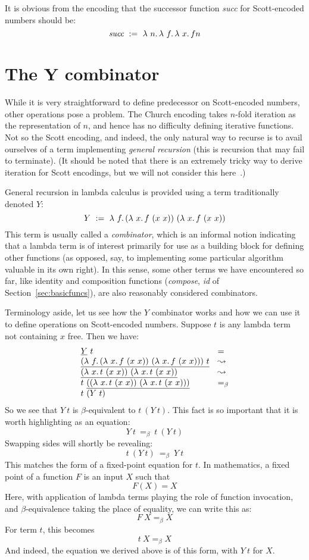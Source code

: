 It is obvious from the encoding that the successor function \textit{succ} for Scott-encoded numbers should be:
\[
\textit{succ}\ := \ \lambda\ n.\, \lambda\ f.\, \lambda\ x.\, f n
\]

\section{The Y combinator}
\label{sec:y}

While it is very straightforward to define predecessor on
Scott-encoded numbers, other operations pose a problem.  The Church
encoding takes $n$-fold iteration as the representation of $n$, and
hence has no difficulty defining iterative functions.  Not so the
Scott encoding, and indeed, the only natural way to recurse is to
avail ourselves of a term implementing \emph{general recursion} (this
is recursion that may fail to terminate).  (It should be noted that
there is an extremely tricky way to derive iteration for Scott encodings, but
we will not consider this here~\cite{lepigre+19}.)

General recursion in lambda calculus is provided using a term traditionally
denoted $Y$:
\[
Y \ :=\ \lam{f}{(\lam{x}{f\ (x\ x)})\ (\lam{x}{f\ (x\ x)})}
\]
\noindent This term is usually called a \emph{combinator}, which is an
informal notion indicating that a lambda term is of interest primarily
for use as a building block for defining other functions (as opposed,
say, to implementing some particular algorithm valuable in its own
right). In this sense, some other terms we have
encountered so far, like identity and composition functions
(\textit{compose}, \textit{id} of Section~\ref{sec:basicfuncs}), are
also reasonably considered combinators.

Terminology aside, let us see how the $Y$ combinator works and how we
can use it to define operations on Scott-encoded numbers.  Suppose $t$ is any
lambda term not containing $x$ free.  Then we have:
\[
\begin{array}{ll}
  \underline{Y}\ t & = \\
  \underline{(\lambda\ f.\, (\lambda\ x.\, f\ (x\ x))\ (\lambda\ x.\, f\ (x\ x)))\ t} & \leadsto \\
  \underline{(\lambda\ x.\, t\ (x\ x))\ (\lambda\ x.\, t\ (x\ x))} & \leadsto \\
  t\ \underline{((\lambda\ x.\, t\ (x\ x))\ (\lambda\ x.\, t\ (x\ x)))} & =_\beta \\
  t\ (Y\ t)
\end{array}
\]
\noindent So we see that $Y\ t$ is $\beta$-equivalent to $t\ (Y\ t)$.  This fact is so important that
it is worth highlighting as an equation:
\[
Y\ t\ =_\beta \ t\ (Y\ t)
\]
\noindent Swapping sides will shortly be revealing:
\[
t\ (Y\ t)\ =_\beta \ Y\ t
\]
\noindent This matches the form of a fixed-point equation for $t$.  In mathematics, a fixed point of a function $F$ is an input $X$ such that
\[
F(X) = X
\]
\noindent Here, with application of lambda terms playing the role of function invocation, and $\beta$-equivalence taking the place of equality,
we can write this as:
\[
F\ X =_\beta X
\]
\noindent For term $t$, this becomes
\[
t\ X =_\beta X
\]
\noindent And indeed, the equation we derived above is of this form, with $Y\ t$ for $X$.


